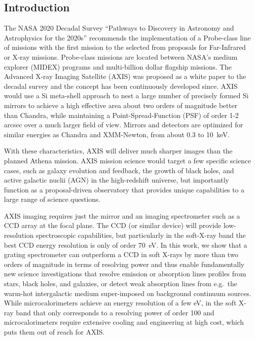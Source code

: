 \documentclass[12pt]{spieman}  %
\begin{document}
\begin{spacing}{1}



\section{Introduction}
\label{sect:introduction}
The NASA 2020 Decadal Survey ``Pathways to Discovery in Astronomy and Astrophysics for the 2020s''\cite{2021pdaa.book.....N} recommends the implementation of a Probe-class line of missions with the first mission to the selected from proposals for Far-Infrared or X-ray missions. Probe-class missions are located between NASA's medium explorer (MIDEX) programs and multi-billion dollar flagship missions. The Advanced X-ray Imaging Satellite (AXIS) was proposed as a white paper \cite{2019BAAS...51g.107M} to the decadal survey and the concept has been continuously developed since. AXIS would use a Si meta-shell approach to nest a large number of precisely formed Si mirrors to achieve a high effective area about two orders of magnitude better than Chandra, while maintaining a Point-Spread-Function (PSF) of order 1-2 arcsec over a much larger field of view. Mirrors and detectors are optimized for similar energies as Chandra and XMM-Newton, from about 0.3 to 10~keV.

With these characteristics, AXIS will deliver much sharper images than the planned Athena mission\cite{doi:10.1117/12.2188988,doi:10.1117/12.2057347}. AXIS mission science would target a few specific science cases, such as galaxy evolution and feedback, the growth of black holes, and active galactic nuclii (AGN) in the high-redshift universe, but importantly function as a proposal-driven observatory that provides unique capabilities to a large range of science questions.

AXIS imaging requires just the mirror and an imaging spectrometer such as a CCD array at the focal plane. The CCD (or similar device) will provide low-resolution spectroscopic capabilities, but particularly in the soft-X-ray band the best CCD energy resolution is only of order 70~eV. In this work, we show that a grating spectrometer can outperform a CCD in soft X-rays by more than two orders of magnitude in terms of resolving power and thus enable fundamentally new science investigations that resolve emission or absorption lines profiles from stars, black holes, and galaxies, or detect weak absorption lines from e.g.\ the warm-hot intergalactic medium super-imposed on background continuum sources. While microcalorimeters achieve an energy resolution of a few eV, in the soft X-ray band that only corresponds to a resolving power of order 100 and microcalorimeters require extensive cooling and engineering at high cost, which puts them out of reach for AXIS\cite{10.1117/1.JATIS.1.1.014006,2022IJMPD..3130001T}.


\end{spacing}
\end{document}
